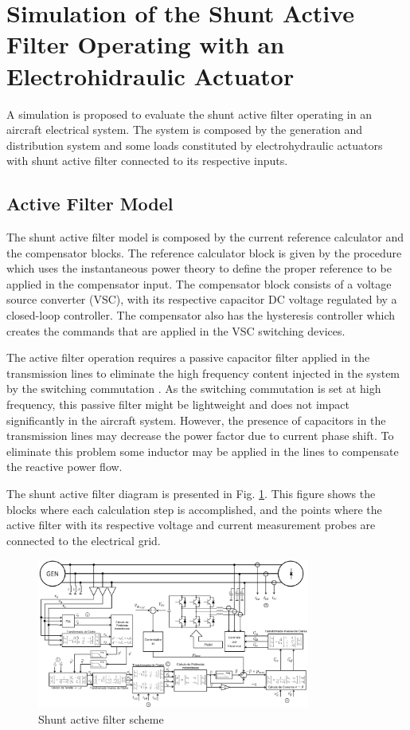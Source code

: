 \section{Simulation of the Shunt Active Filter Operating with an Electrohidraulic Actuator}

A simulation is proposed to evaluate the shunt active filter operating in an aircraft electrical system. The system is composed by the generation and distribution system and some loads constituted by electrohydraulic actuators with shunt active filter connected to its respective inputs.

\subsection{Active Filter Model}

The shunt active filter model is composed by the current reference calculator and the compensator blocks. The reference calculator block is given by the procedure which uses the instantaneous power theory to define the proper reference to be applied in the compensator input. The compensator block consists of a voltage source converter (VSC), with its respective capacitor DC voltage regulated by a closed-loop controller. The compensator also has the hysteresis controller which creates the commands that are applied in the VSC switching devices.

The active filter operation requires a passive capacitor filter applied in the transmission lines to eliminate the high frequency content injected in the system by the switching commutation \cite{}. As the switching commutation is set at high frequency, this passive filter might be lightweight and does not impact significantly in the aircraft system. However, the presence of capacitors in the transmission lines may decrease the power factor due to current phase shift. To eliminate this problem some inductor may be applied in the lines to compensate the reactive power flow.

The shunt active filter diagram is presented in Fig. \ref{fig:filtro_blocos.png}. This figure shows the blocks where each calculation step is accomplished, and the points where the active filter with its respective voltage and current measurement probes are connected to the electrical grid.

\begin{figure}[!tb] %
	\centering
	\includegraphics[width=0.8\textwidth]{Figures/filtro_blocos.png}
	\caption{Shunt active filter scheme}
	\label{fig:filtro_blocos.png}
\end{figure}

